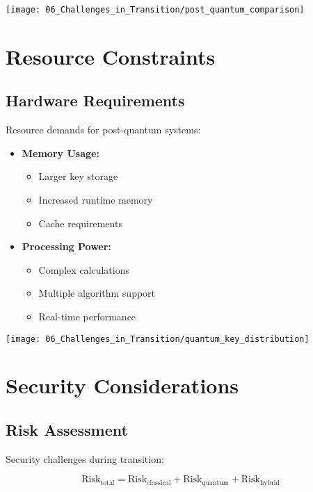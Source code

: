 \texttt{[image: 06\_Challenges\_in\_Transition/post\_quantum\_comparison]}

\section{Resource Constraints}\label{sec:resources}

\subsection{Hardware Requirements}\label{subsec:hardware}
Resource demands for post-quantum systems:

\begin{itemize}
    \item \textbf{Memory Usage:}
    \begin{itemize}
        \item Larger key storage
        \item Increased runtime memory
        \item Cache requirements
    \end{itemize}
    \item \textbf{Processing Power:}
    \begin{itemize}
        \item Complex calculations
        \item Multiple algorithm support
        \item Real-time performance
    \end{itemize}
\end{itemize}

\texttt{[image: 06\_Challenges\_in\_Transition/quantum\_key\_distribution]}

\section{Security Considerations}\label{sec:security}

\subsection{Risk Assessment}\label{subsec:risk}
Security challenges during transition:

\begin{equation}\label{eq:risk}
    \text{Risk}_{\text{total}} = \text{Risk}_{\text{classical}} + \text{Risk}_{\text{quantum}} + \text{Risk}_{\text{hybrid}}
\end{equation}

